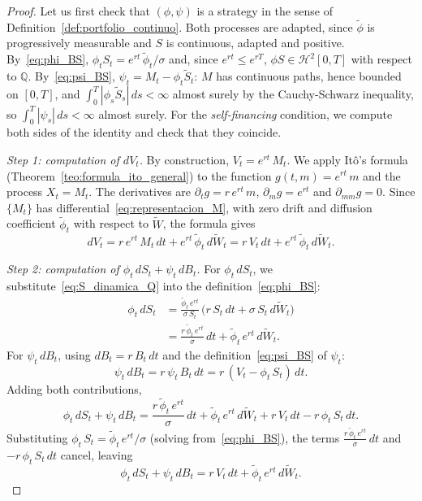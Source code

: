 \documentclass[11pt,a4paper,oneside]{report}
\theoremstyle{plain}
\theoremstyle{definition}
\theoremstyle{remark}
\newcommand{\Q}{\mathbb{Q}}
\newcommand{\1}{\mathbf{1}}
\begin{document}
\begin{proof}
Let us first check that $(\phi, \psi)$ is a strategy in the sense of Definition~\ref{def:portfolio_continuo}. Both processes are adapted, since $\widetilde\phi$ is progressively measurable and $S$ is continuous, adapted and positive. By~\eqref{eq:phi_BS}, $\phi_t S_t = e^{rt}\, \widetilde\phi_t / \sigma$ and, since $e^{rt} \le e^{rT}$, $\phi S \in \mathcal{H}^2[0, T]$ with respect to $\Q$. By~\eqref{eq:psi_BS}, $\psi_t = M_t - \phi_t \widetilde S_t$: $M$ has continuous paths, hence bounded on $[0, T]$, and $\int_0^T |\phi_s \widetilde S_s|\, ds < \infty$ almost surely by the Cauchy-Schwarz inequality, so $\int_0^T |\psi_s|\, ds < \infty$ almost surely. For the \emph{self-financing} condition, we compute both sides of the identity and check that they coincide.

\emph{Step 1: computation of $dV_t$.} By construction,
$V_t = e^{rt}\, M_t$. We apply Itô's formula
(Theorem~\ref{teo:formula_ito_general}) to the function
$g(t, m) = e^{rt}\, m$ and the process $X_t = M_t$. The derivatives
are $\partial_t g = r\, e^{rt}\, m$, $\partial_m g = e^{rt}$ and
$\partial_{mm} g = 0$. Since $\{M_t\}$ has
differential~\eqref{eq:representacion_M}, with zero drift and
diffusion coefficient $\widetilde\phi_t$ with respect to
$\widetilde W$, the formula gives
\begin{equation}\label{eq:dV_calculado}
  dV_t = r\, e^{rt}\, M_t\, dt + e^{rt}\, \widetilde\phi_t\, d\widetilde W_t
       = r\, V_t\, dt + e^{rt}\, \widetilde\phi_t\, d\widetilde W_t.
\end{equation}

\emph{Step 2: computation of $\phi_t\, dS_t + \psi_t\, dB_t$.} For
$\phi_t\, dS_t$, we substitute~\eqref{eq:S_dinamica_Q} into the
definition~\eqref{eq:phi_BS}:
\begin{align*}
  \phi_t\, dS_t
  &= \frac{\widetilde\phi_t\, e^{rt}}{\sigma\, S_t}\,
     \bigl(r\, S_t\, dt + \sigma\, S_t\, d\widetilde W_t\bigr) \\
  &= \frac{r\, \widetilde\phi_t\, e^{rt}}{\sigma}\, dt
   + \widetilde\phi_t\, e^{rt}\, d\widetilde W_t.
\end{align*}
For $\psi_t\, dB_t$, using $dB_t = r\, B_t\, dt$ and the
definition~\eqref{eq:psi_BS} of $\psi_t$:
\begin{equation*}
  \psi_t\, dB_t = r\, \psi_t\, B_t\, dt
              = r\, (V_t - \phi_t\, S_t)\, dt.
\end{equation*}
Adding both contributions,
\begin{equation*}
  \phi_t\, dS_t + \psi_t\, dB_t
  = \frac{r\, \widetilde\phi_t\, e^{rt}}{\sigma}\, dt
   + \widetilde\phi_t\, e^{rt}\, d\widetilde W_t
   + r\, V_t\, dt - r\, \phi_t\, S_t\, dt.
\end{equation*}
Substituting $\phi_t\, S_t = \widetilde\phi_t\, e^{rt} / \sigma$
(solving from~\eqref{eq:phi_BS}), the terms
$\frac{r\, \widetilde\phi_t\, e^{rt}}{\sigma}\, dt$ and
$-r\, \phi_t\, S_t\, dt$ cancel, leaving
\begin{equation}\label{eq:dV_self_financing}
  \phi_t\, dS_t + \psi_t\, dB_t
  = r\, V_t\, dt + \widetilde\phi_t\, e^{rt}\, d\widetilde W_t.
\end{equation}


\end{proof}
\end{document}
